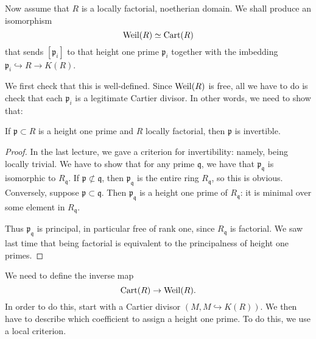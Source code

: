 Now assume that $R$ is a locally factorial, noetherian domain. 
We shall produce an isomorphism
\[ \operatorname{Weil}(R) \simeq \operatorname{Cart}(R)  \]
that sends $[\mathfrak{p}_i]$ to that height one prime $\mathfrak{p}_i$
together with the imbedding $\mathfrak{p}_i \hookrightarrow R \to K(R)$. 

We first check that this is well-defined. Since $\operatorname{Weil}(R)$ is free, all we have
to do is check that each $\mathfrak{p}_i$ is a legitimate Cartier divisor. In
other words, we need to show that:

\begin{proposition} 
If $\mathfrak{p} \subset R$ is a height one prime and $R$ locally factorial, then $\mathfrak{p}$ is
invertible. 
\end{proposition} 
\begin{proof} 
In the last lecture, we gave a criterion for invertibility: namely, being
locally trivial. We have to show that for any prime $\mathfrak{q}$, we have
that $\mathfrak{p}_{\mathfrak{q}}$ is isomorphic to $R_{\mathfrak{q}}$. If
$\mathfrak{p} \not\subset \mathfrak{q}$, then $\mathfrak{p}_{\mathfrak{q}}$ is
the entire ring $R_{\mathfrak{q}}$, so this is obvious. Conversely, suppose
$\mathfrak{p} \subset {\mathfrak{q}}$. Then $\mathfrak{p}_{\mathfrak{q}}$ is
a height one prime of $R_{\mathfrak{q}}$: it is minimal over some element in
$R_{\mathfrak{q}}$. 

Thus $\mathfrak{p}_{\mathfrak{q}}$ is principal, in particular free of rank
one, since $R_{\mathfrak{q}}$ is factorial. We saw last time that being
factorial is equivalent to the principalness of height one primes. 
\end{proof} 

We need to define the inverse map
\[ \operatorname{Cart}(R) \to \operatorname{Weil}(R).  \]
In order to do this, start with a Cartier divisor $(M, M \hookrightarrow
K(R))$. We then have to describe which coefficient to assign a height one
prime. To do this, we use a local criterion. 

